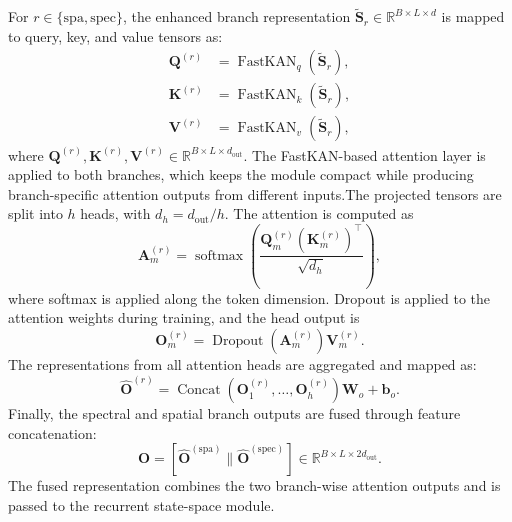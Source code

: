 \documentclass{revision_assets/ieeeaccess_revision}
\begin{document}
For $r\in\{\mathrm{spa},\mathrm{spec}\}$, the enhanced branch representation
$\widetilde{\mathbf{S}}_{r}\in\mathbb{R}^{B\times L\times d}$ is mapped to query, key, and value tensors as:
\begin{equation}
\begin{aligned}
\mathbf{Q}^{(r)}
&=
\operatorname{FastKAN}_{q}
\left(
\widetilde{\mathbf{S}}_{r}
\right),\\
\mathbf{K}^{(r)}
&=
\operatorname{FastKAN}_{k}
\left(
\widetilde{\mathbf{S}}_{r}
\right),\\
\mathbf{V}^{(r)}
&=
\operatorname{FastKAN}_{v}
\left(
\widetilde{\mathbf{S}}_{r}
\right),
\end{aligned}
\label{eq:fssa_qkv}
\end{equation}
where $\mathbf{Q}^{(r)},\mathbf{K}^{(r)},\mathbf{V}^{(r)}\in\mathbb{R}^{B\times L\times d_{\mathrm{out}}}$. The FastKAN-based attention layer is applied to both branches, which keeps the module compact while producing branch-specific attention outputs from different inputs.The projected tensors are split into $h$ heads, with $d_h=d_{\mathrm{out}}/h$. The attention is computed as
\begin{equation}
\mathbf{A}^{(r)}_{m}
=
\operatorname{softmax}
\left(
\frac{
\mathbf{Q}^{(r)}_{m}
\left(
\mathbf{K}^{(r)}_{m}
\right)^{\top}
}
{\sqrt{d_h}}
\right),
\label{eq:fssa_attention}
\end{equation}
where softmax is applied along the token dimension. Dropout is applied to the attention weights during training, and the head output is
\begin{equation}
\mathbf{O}^{(r)}_{m}
=
\operatorname{Dropout}
\left(
\mathbf{A}^{(r)}_{m}
\right)
\mathbf{V}^{(r)}_{m}.
\label{eq:fssa_head_output}
\end{equation}
The representations from all attention heads are aggregated and mapped as:
\begin{equation}
\widehat{\mathbf{O}}^{(r)}
=
\operatorname{Concat}
\left(
\mathbf{O}^{(r)}_{1},
\ldots,
\mathbf{O}^{(r)}_{h}
\right)
\mathbf{W}_{o}
+
\mathbf{b}_{o}.
\label{eq:fssa_output_projection}
\end{equation}
Finally, the spectral and spatial branch outputs are fused through feature concatenation:
\begin{equation}
\mathbf{O}
=
\left[
\widehat{\mathbf{O}}^{(\mathrm{spa})}
\parallel
\widehat{\mathbf{O}}^{(\mathrm{spec})}
\right]
\in
\mathbb{R}^{B\times L\times 2d_{\mathrm{out}}}.
\label{eq:fssa_fusion}
\end{equation}
The fused representation combines the two branch-wise attention outputs and is passed to the recurrent state-space module.
\end{document}
